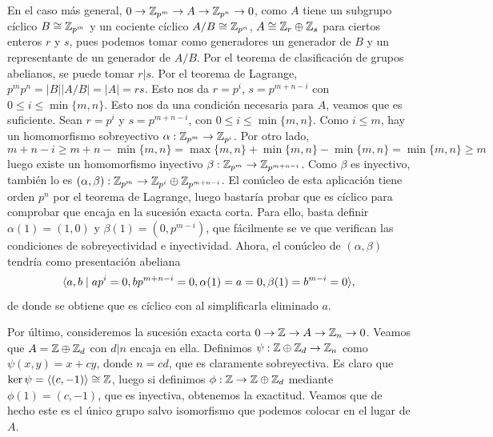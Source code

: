 \documentclass[twoside]{article}
\begin{document}
\begin{solucion}
En el caso más general, $0\to \mathbb{Z}_{p^m}\to A\to \mathbb{Z}_{p^n}\to 0$, como $A$ tiene un subgrupo cíclico $B\cong\mathbb{Z}_{p^m}$ y un cociente cíclico $A/B\cong\mathbb{Z}_{p^n}$, $A\cong\mathbb{Z}_r\oplus\mathbb{Z}_s$ para ciertos enteros $r$ y $s$, pues podemos tomar como generadores un generador de $B$ y un representante de un generador de $A/B$. Por el teorema de clasificación de grupos abelianos, se puede tomar $r|s$. Por el teorema de Lagrange, $p^mp^n=|B||A/B|=|A|= rs$. Esto nos da $r=p^i$, $s=p^{m+n-i}$ con $0\leq i\leq \min\{m,n\}$. Esto nos da una condición necesaria para $A$, veamos que es suficiente. Sean $r=p^i$ y $s=p^{m+n-i}$, con $0\leq i\leq\min\{m,n\}$. Como $i\leq m$, hay un homomorfismo sobreyectivo $\alpha:\mathbb{Z}_{p^m}\to \mathbb{Z}_{p^i}$. Por otro lado, 
\[
m+n-i\geq m+n-\min\{m,n\}=\max\{m,n\}+\min\{m,n\}-\min\{m,n\}=\min\{m,n\}\geq m
\] 
luego existe un homomorfismo inyectivo $\beta:\mathbb{Z}_{p^m}\to\mathbb{Z}_{p^{m+n-i}}$. Como $\beta$ es inyectivo, también lo es $(\alpha,\beta):\mathbb{Z}_{p^m}\to \mathbb{Z}_{p^i}\oplus\mathbb{Z}_{p^{m+n-i}}$. El conúcleo de esta aplicación tiene orden $p^n$ por el teorema de Lagrange, luego bastaría probar que es cíclico para comprobar que encaja en la sucesión exacta corta. Para ello, basta definir $\alpha(1)=(1,0)$ y $\beta(1)=(0, p^{m-i})$, que fácilmente se ve que verifican las condiciones de sobreyectividad e inyectividad. Ahora, el conúcleo de $(\alpha,\beta)$ tendría como presentación abeliana $$\langle{a,b\mid ap^i=0, bp^{m+n-i}=0, \alpha(1)=a=0, \beta(1)=b^{m-i}=0}\rangle,$$ de donde se obtiene que es cíclico con al simplificarla eliminado $a$.


  

Por último, consideremos la sucesión exacta corta $0\to\mathbb{Z}\to A\to \mathbb{Z}_n\to 0$. Veamos que $A=\mathbb{Z}\oplus\mathbb{Z}_d$ con $d|n$ encaja en ella. Definimos $\psi:\mathbb{Z}\oplus\mathbb{Z}_d\to\mathbb{Z}_n$ como $\psi(x,y)=x+cy$, donde $n=cd$, que es claramente sobreyectiva. Es claro que $\ker\psi=\langle{(c,-1)}\rangle\cong\mathbb{Z}$, luego si definimos $\phi:\mathbb{Z}\to \mathbb{Z}\oplus\mathbb{Z}_d$ mediante $\phi(1)=(c,-1)$, que es inyectiva, obtenemos la exactitud. Veamos que de hecho este es el único grupo salvo isomorfismo que podemos colocar en el lugar de $A$.
    

\end{solucion}
\end{document}
